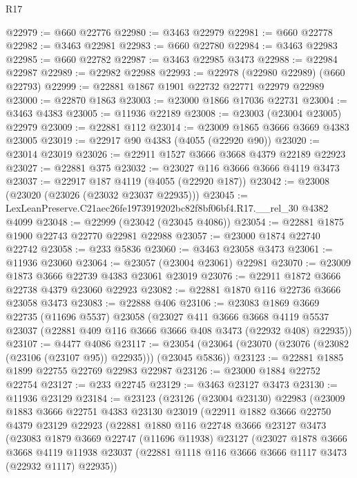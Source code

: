 \begin{lexlean}{R17}
\begin{coremodule}
@22979 := @660 @22776
@22980 := @3463 @22979
@22981 := @660 @22778
@22982 := @3463 @22981
@22983 := @660 @22780
@22984 := @3463 @22983
@22985 := @660 @22782
@22987 := @3463 @22985 @3473
@22988 := @22984 @22987
@22989 := @22982 @22988
@22993 := @22978 (@22980 @22989) (@660 @22793)
@22999 := @22881 @1867 @1901 @22732 @22771 @22979 @22989
@23000 := @22870 @1863
@23003 := @23000 @1866 @17036 @22731
@23004 := @3463 @4383
@23005 := @11936 @22189
@23008 := @23003 (@23004 @23005) @22979
@23009 := @22881 @112
@23014 := @23009 @1865 @3666 @3669 @4383 @23005
@23019 := @22917 @90 @4383 (@4055 (@22920 @90))
@23020 := @23014 @23019
@23026 := @22911 @1527 @3666 @3668 @4379 @22189 @22923
@23027 := @22881 @375
@23032 := @23027 @116 @3666 @3666 @4119 @3473
@23037 := @22917 @187 @4119 (@4055 (@22920 @187))
@23042 := @23008 (@23020 (@23026 (@23032 @23037 @22935)))
@23045 := LexLeanPreserve.C21aec26fe1973919202bc82f8bf06bf4.R17.__rel_30 @4382 @4099
@23048 := @22999 (@23042 (@23045 @4086))
@23054 := @22881 @1875 @1900 @22743 @22770 @22981 @22988
@23057 := @23000 @1874 @22740 @22742
@23058 := @233 @5836
@23060 := @3463 @23058 @3473
@23061 := @11936 @23060
@23064 := @23057 (@23004 @23061) @22981
@23070 := @23009 @1873 @3666 @22739 @4383 @23061 @23019
@23076 := @22911 @1872 @3666 @22738 @4379 @23060 @22923
@23082 := @22881 @1870 @116 @22736 @3666 @23058 @3473
@23083 := @22888 @406
@23106 := @23083
    @1869
    @3669
    @22735
    (@11696 @5537)
    @23058
    (@23027
      @411
      @3666
      @3668
      @4119
      @5537
      @23037
      (@22881 @409 @116 @3666 @3666 @408 @3473 (@22932 @408) @22935))
@23107 := @4477 @4086
@23117 := @23054 (@23064 (@23070 (@23076 (@23082 (@23106 (@23107 @95)) @22935))) (@23045 @5836))
@23123 := @22881 @1885 @1899 @22755 @22769 @22983 @22987
@23126 := @23000 @1884 @22752 @22754
@23127 := @233 @22745
@23129 := @3463 @23127 @3473
@23130 := @11936 @23129
@23184 := @23123
    (@23126
      (@23004 @23130)
      @22983
      (@23009
        @1883
        @3666
        @22751
        @4383
        @23130
        @23019
        (@22911
          @1882
          @3666
          @22750
          @4379
          @23129
          @22923
          (@22881
            @1880
            @116
            @22748
            @3666
            @23127
            @3473
            (@23083
              @1879
              @3669
              @22747
              (@11696 @11938)
              @23127
              (@23027
                @1878
                @3666
                @3668
                @4119
                @11938
                @23037
                (@22881 @1118 @116 @3666 @3666 @1117 @3473 (@22932 @1117) @22935))

\end{coremodule}
\end{lexlean}

